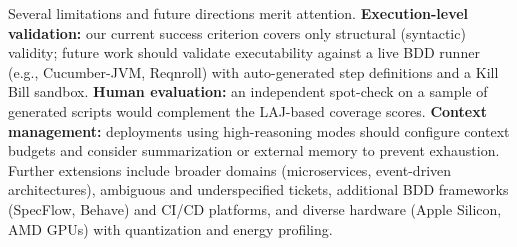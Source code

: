 \documentclass[runningheads]{llncs}
\begin{document}
Several limitations and future directions merit attention. \textbf{Execution-level validation:} our current success criterion covers only structural (syntactic) validity; future work should validate executability against a live BDD runner (e.g., Cucumber-JVM, Reqnroll) with auto-generated step definitions and a Kill Bill sandbox. \textbf{Human evaluation:} an independent spot-check on a sample of generated scripts would complement the LAJ-based coverage scores. \textbf{Context management:} deployments using high-reasoning modes should configure context budgets and consider summarization or external memory to prevent exhaustion. Further extensions include broader domains (microservices, event-driven architectures), ambiguous and underspecified tickets, additional BDD frameworks (SpecFlow, Behave) and CI/CD platforms, and diverse hardware (Apple Silicon, AMD GPUs) with quantization and energy profiling.

\end{document}
